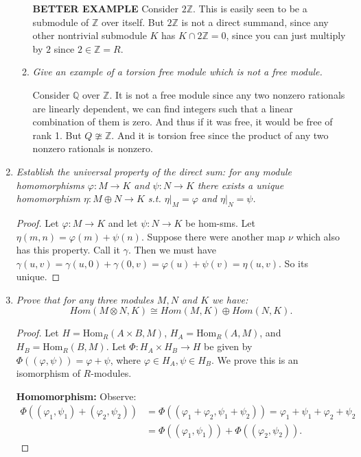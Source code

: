 \documentclass[12pt]{amsbook}
\theoremstyle{plain}
\numberwithin{section}{chapter}
\numberwithin{equation}{chapter}
\theoremstyle{definition}
\theoremstyle{remark}
\newcommand{\z}{\mathbb{Z}}
\newcommand{\Q}{\mathbb{Q}}
\newcommand{\bb}{\vspace{3mm}}
\renewcommand{\phi}{\varphi}
\begin{document}
\begin{enumerate}[label=\arabic*.]
\begin{enumerate}
\textbf{BETTER EXAMPLE} Consider $2\z$. This is easily seen to be a submodule of $\z$ over itself. But $2\z$ is not a direct summand, since any other nontrivial submodule $K$ has $K \cap 2\z = 0$, since you can just multiply by $2$ since $2 \in \z = R$. 
\bb
\item \textit{Give an example of a torsion free module which is not a free module. }

Consider $\Q$ over $\z$. It is not a free module since any two nonzero rationals are linearly dependent, we can find integers such that a linear combination of them is zero. And thus if it was free, it would be free of rank 1. But $Q \ncong \z$. And it is torsion free since the product of any two nonzero rationals is nonzero. 
\end{enumerate}
\bb

\item \textit{Establish the universal property of the direct sum: for any module homomorphisms $\phi:M \to K$ and $\psi:N \to K$ there exists a unique homomorphism $\eta:M \oplus N \to K$ s.t. $\eta|_M = \phi$ and $\eta|_N = \psi$. }

\begin{proof}
Let $\phi:M \to K$ and let $\psi:N \to K$ be hom-sms. Let $\eta(m,n) = \phi(m) + \psi(n)$. Suppose there were another map $\nu$ which also has this property. Call it $
\gamma$. Then we must have $\gamma(u,v) = \gamma(u,0) + \gamma(0,v) = \phi(u) + \psi(v) = \eta(u,v)$. So its unique. 
\end{proof}

\item \textit{Prove that for any three modules $M,N$ and $K$ we have:
$$
Hom(M \otimes N,K) \cong Hom(M,K) \oplus Hom(N,K).
$$}

\begin{proof}
Let $H = \text{Hom}_R(A\times B,M)$, $H_A = \text{Hom}_R(A,M)$, and $H_B = \text{Hom}_R(B,M)$. Let $\Phi: H_A \times H_B\to H$ be given by $\Phi((\phi,\psi)) = \phi + \psi$, where $\phi \in H_A,\psi \in H_B$. We prove this is an isomorphism of $R$-modules. 

\textbf{Homomorphism: }Observe: 
\begin{equation}
\begin{aligned}
\Phi((\phi_1,\psi_1) + (\phi_2,\psi_2)) &= \Phi((\phi_1 + \phi_2,\psi_1 + \psi_2)) = \phi_1 + \psi_1 + \phi_2 + \psi_2\\ &= \Phi((\phi_1,\psi_1)) + \Phi((\phi_2,\psi_2)).
\end{aligned}
\end{equation}


\end{proof}
\end{enumerate}
\end{document}
